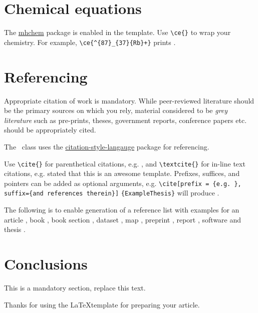 \documentclass[submission, anonymous]{sedimentologika}
\begin{document}
\section{Chemical equations}
The \href{https://mirrors.ctan.org/macros/latex/contrib/mhchem/mhchem.pdf}{{mhchem}} package is enabled in the template.
Use \verb|\ce{}| to wrap your chemistry.
For example, \verb|\ce{^{87}_{37}{Rb}+}| prints .

\section{Referencing}

Appropriate citation of work is mandatory.
While peer-reviewed literature should be the primary sources on which you rely, material considered to be \textit{grey literature} such as pre-prints, theses, government reports, conference papers etc. should be appropriately cited.

The \Sedimentologika\ class uses the \href{https://mirrors.ctan.org/biblio/citation-style-language/citation-style-language-doc.pdf}{citation-style-langauge} package for referencing.

Use \verb|\cite{}| for parenthetical citations, e.g. \cite{ExampleBook}, and \verb|\textcite{}| for in-line text citations, e.g. \textcite{ExampleArticle} stated that this is an awesome template.
Prefixes, suffices, and pointers can be added as optional arguments, e.g.
\verb|\cite[prefix = {e.g. },|
\verb|suffix={and references therein}]|
\verb|{ExampleThesis}|
will produce \cite[prefix = {e.g. }, suffix={and references therein}]{ExampleThesis}.

The following is to enable generation of a reference list with examples for an article \cite{ExampleArticle}, book \cite{ExampleBook}, book section \cite{ExampleBookSection}, dataset \cite{ExampleDataset}, map \cite{ExampleMap}, preprint \cite{ExamplePreprint}, report \cite{ExampleReport}, software \cite{ExampleSoftware} and thesis \cite{ExampleThesis}.

\section{Conclusions}
This is a mandatory section, replace this text.

Thanks for using the \Sedimentologika\space \LaTeX\space template for preparing your article.

\end{document}
